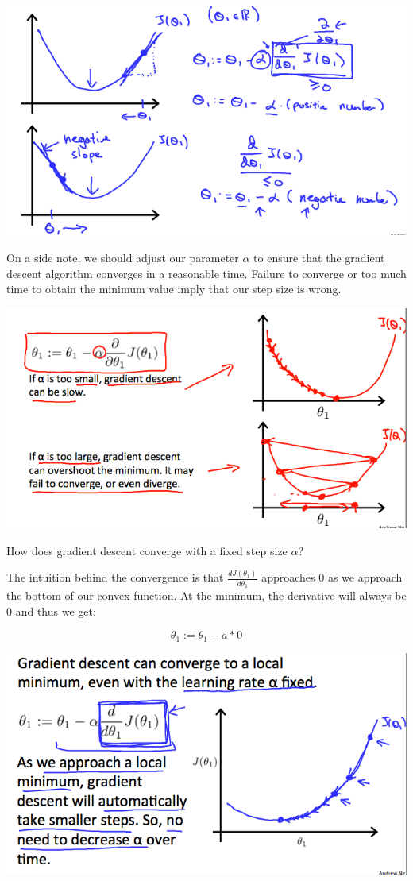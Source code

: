 \documentclass[UTF8]{article}
\begin{document}
\includegraphics[width = \textwidth]{NotePics/2_3_1_1.png}

On a side note, we should adjust our parameter $\alpha$ to ensure that the gradient descent algorithm converges in a reasonable time. Failure to converge or too much time to obtain the minimum value imply that our step size is wrong.

\includegraphics[width = \textwidth]{NotePics/2_3_1_2.png}

How does gradient descent converge with a fixed step size $\alpha$?

The intuition behind the convergence is that $\frac{dJ(\theta_1)}{d\theta_1}$ approaches 0 as we approach the bottom of our convex function. At the minimum, the derivative will always be 0 and thus we get:

\[ \theta_1:=\theta_1-a*0 \]

\includegraphics[width = \textwidth]{NotePics/2_3_1_3.png}
\end{document}
